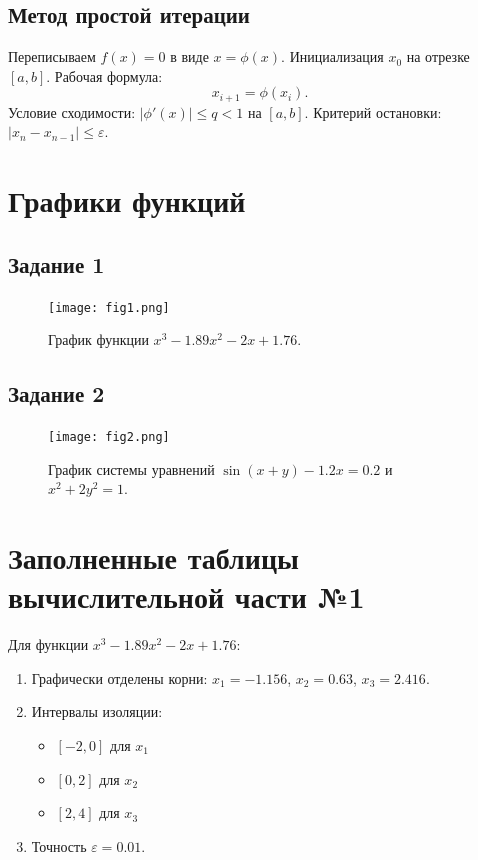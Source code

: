 \documentclass[a4paper,12pt]{article}
\begin{document}
\subsection{Метод простой итерации}
Переписываем $f(x)=0$ в виде $x=\phi(x)$. Инициализация $x_0$ на отрезке $[a,b]$. Рабочая формула:
\[ x_{i+1} = \phi(x_i). \]
Условие сходимости: $|\phi'(x)| \le q < 1$ на $[a,b]$. Критерий остановки: $|x_n - x_{n-1}| \le \varepsilon$.

\section{Графики функций}
\subsection{Задание 1}
\begin{figure}[h!]
  \centering
  \texttt{[image: fig1.png]}
  \caption{График функции $x^3 - 1.89x^2 - 2x + 1.76$.}
\end{figure}

\subsection{Задание 2}
\begin{figure}[h!]
  \centering
  \texttt{[image: fig2.png]}
  \caption{График системы уравнений $\sin(x+y)-1.2x=0.2$ и $x^2+2y^2=1$.}
\end{figure}

\section{Заполненные таблицы вычислительной части №1}
Для функции $x^3 - 1.89x^2 - 2x + 1.76$:
\begin{enumerate}
  \item Графически отделены корни: $x_1=-1.156$, $x_2=0.63$, $x_3=2.416$.
  \item Интервалы изоляции:
    \begin{itemize}
      \item $[-2,0]$ для $x_1$
      \item $[0,2]$ для $x_2$
      \item $[2,4]$ для $x_3$
    \end{itemize}
  \item Точность $\varepsilon=0.01$.
\end{enumerate}
\end{document}

